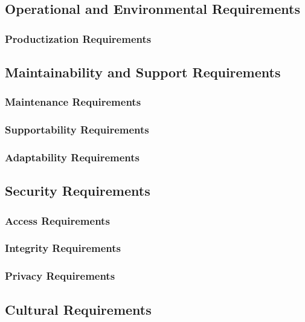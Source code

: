 \documentclass[12pt, titlepage]{article}
\begin{document}
\subsection{Operational and Environmental Requirements}

\subsubsection{Productization Requirements}

\subsection{Maintainability and Support Requirements}

\subsubsection{Maintenance Requirements}

\subsubsection{Supportability Requirements}

\subsubsection{Adaptability Requirements}

\subsection{Security Requirements}

\subsubsection{Access Requirements}

\subsubsection{Integrity Requirements}

\subsubsection{Privacy Requirements}

\subsection{Cultural Requirements}
\end{document}
